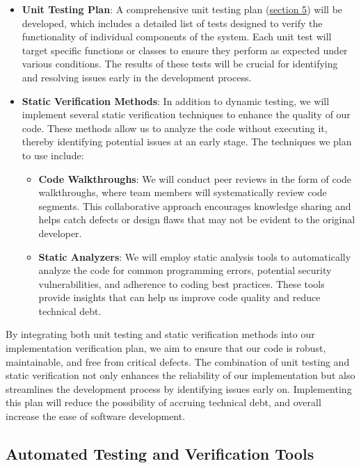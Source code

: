 \documentclass[12pt, titlepage]{article}
\begin{document}
\begin{itemize}
    \item \textbf{Unit Testing Plan}: A comprehensive unit testing plan (\hyperref[sec:unit_tests]{section 5}) will be developed, 
    which includes a detailed list of tests designed to verify the functionality of individual components of the system. Each unit 
    test will target specific functions or classes to ensure they perform as expected under various conditions. The results of 
    these tests will be crucial for identifying and resolving issues early in the development process.

    \item \textbf{Static Verification Methods}: In addition to dynamic testing, we will implement several static verification techniques 
    to enhance the quality of our code. These methods allow us to analyze the code without executing it, thereby identifying potential 
    issues at an early stage. The techniques we plan to use include:
    \begin{itemize}
        \item \textbf{Code Walkthroughs}: We will conduct peer reviews in the form of code walkthroughs, where team members will 
        systematically review code segments. This collaborative approach encourages knowledge sharing and helps catch defects or design 
        flaws that may not be evident to the original developer.
        \item \textbf{Static Analyzers}: We will employ static analysis tools to automatically analyze the code for common programming 
        errors, potential security vulnerabilities, and adherence to coding best practices. These tools provide insights that can help 
        us improve code quality and reduce technical debt.
    \end{itemize}
\end{itemize}

\noindent By integrating both unit testing and static verification methods into our implementation verification plan, we aim to ensure 
that our code is robust, maintainable, and free from critical defects. The combination of unit testing and static verification not only 
enhances the reliability of our implementation but also streamlines the development process by identifying issues early on. Implementing
this plan will reduce the possibility of accruing technical debt, and overall increase the ease of software development.

\subsection{Automated Testing and Verification Tools}
\end{document}
